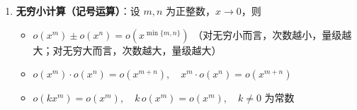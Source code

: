 \documentclass[../book.tex]{subfiles}
\begin{document}
\begin{enumerate}
\begin{itemize}
            \item $\displaystyle \tan x = x + \frac{x^3}{3} + o(x^3) \Rightarrow \tan \text{狗} - \text{狗} \sim \frac{\text{狗}^3}{3}, \quad \text{狗}\to 0$
            \item $\displaystyle \arcsin x = x + \frac{x^3}{6} + o(x^3) \Rightarrow \arcsin \text{狗} - \text{狗} \sim \frac{\text{狗}^3}{6}, \quad \text{狗}\to 0$
            \item $\displaystyle \frac{1}{1+x^2} = 1 - x^2 + x^4 + o(x^4)$
        \end{itemize}
        \item \textbf{无穷小计算（记号运算）}：设 $m,n$ 为正整数，$x\to 0$，则
        \begin{itemize}
            \item $o(x^m)\pm o(x^n)=o\!\left(x^{\min\{m,n\}}\right)$
            （对无穷小而言，次数越小，量级越大；对无穷大而言，次数越大，量级越大）

            \item $o(x^m)\cdot o(x^n)=o(x^{m+n}),\quad
            x^m\cdot o(x^n)=o(x^{m+n})$

            \item $o(kx^m)=o(x^m),\quad
            k\,o(x^m)=o(x^m),\quad k\neq 0\text{ 为常数}$
        \end{itemize}


\end{enumerate}
\end{document}
